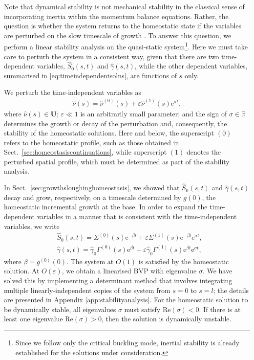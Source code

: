 Note that dynamical stability is not mechanical stability in the classical sense of incorporating inertia within the momentum balance equations. Rather, the question is whether the system returns to the homeostatic state if the variables are perturbed on the slow timescale of growth \cite{erlich2019homeostatic}. To answer this question, we perform a linear stability analysis on the quasi-static system\footnote{Since we follow only the critical buckling mode, inertial stability is already established for the solutions under consideration.}. Here we must take care to perturb the system in a consistent way, given that there are two time-dependent variables, $\hat{S}_0(s, t)$ and $\hat{\gamma}(s, t)$, while the other dependent variables, summarised in \eqref{eq:timeindependentsolns}, are functions of $s$ only. 

We perturb the time-independent variables as
\begin{align}
\hat{\nu}(s) = \hat{\nu}^{(0)}(s) + \varepsilon\hat{\nu}^{(1)}(s)\mathrm{e}^{\sigma t},\label{eq:timeindeptsolnpert}
\end{align}
where $\hat{\nu}(s) \in\mathbf{U}$; $\varepsilon \ll 1$ is an arbitrarily small parameter; and the sign of $\sigma \in \mathbb{R}$ determines the growth or decay of the perturbation and, consequently, the stability of the homeostatic solutions. Here and below, the superscript $(0)$ refers to the homeostatic profile, such as those obtained in Sect.\ \ref{sec:homeostasiscontinuations}, while superscript $(1)$ denotes the perturbed spatial profile, which must be determined as part of the stability analysis.

In Sect.\ \ref{sec:growthsloughinghomeostasis}, we showed that $\hat{S}_0(s, t)$ and $\hat{\gamma}(s, t)$ decay and grow, respectively, on a timescale determined by $g(0)$, the homeostatic incremental growth at the base. In order to expand the time-dependent variables in a manner that is consistent with the time-independent variables, we write
\begin{align}
&\hat{S}_0(s, t) = \Sigma^{(0)}(s)\mathrm{e}^{-\beta t} + \varepsilon \Sigma^{(1)}(s)\mathrm{e}^{-\beta t}\mathrm{e}^{\sigma t},\label{eq:S0pert}\\
&\hat{\gamma}(s, t) = \hat{\gamma}_0\Gamma^{(0)}(s)\mathrm{e}^{\beta t} + \varepsilon \hat{\gamma}_0\Gamma^{(1)}(s)\mathrm{e}^{\beta t}\mathrm{e}^{\sigma t},\label{eq:gammapert}
\end{align}
where $\beta = g^{(0)}(0)$. %
The system at $O(1)$ is satisfied by the homeostatic solution. At $O(\varepsilon)$, we obtain a linearised BVP with eigenvalue $\sigma$. We have solved this by implementing a determinant method that involves integrating multiple linearly-independent copies of the system from $s=0$ to $s=l$; the details are presented in Appendix \ref{app:stabilityanalysis}. For the homeostatic solution to be dynamically stable, all eigenvalues $\sigma$ must satisfy $\mathrm{Re}(\sigma) < 0$. If there is at least one eigenvalue $\mathrm{Re}(\sigma) > 0$, then the solution is dynamically unstable.

